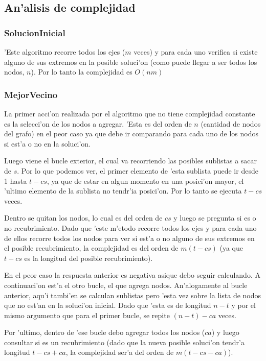 \subsection{An'alisis de complejidad}
\subsubsection{SolucionInicial}
'Este algoritmo recorre todos los ejes ($m$ veces) y para cada uno verifica si existe alguno de sus extremos en la posible soluci'on (como puede llegar a ser todos los nodos, $n$). Por lo tanto la complejidad es $O(nm)$ 

\subsubsection{MejorVecino}
La primer acci'on realizada por el algoritmo que no tiene complejidad constante es la selecci'on de los nodos a agregar. 'Esta es del orden de $n$ (cantidad de nodos del grafo) en el peor caso ya que debe ir comparando para cada uno de los nodos si est'a o no en la soluci'on.

Luego viene el bucle exterior, el cual va recorriendo las posibles sublistas a sacar de $s$. Por lo que podemos ver, el primer elemento de 'esta sublista puede ir desde 1 hasta $t-cs$, ya que de estar en algun momento en una posici'on mayor, el 'ultimo elemento de la sublista no tendr'ia posici'on. Por lo tanto se ejecuta $t-cs$ veces.

Dentro se quitan los nodos, lo cual es del orden de $cs$ y luego se pregunta si es o no recubrimiento. Dado que 'este m'etodo recorre todos los ejes y para cada uno de ellos recorre todos los nodos para ver si est'a o no alguno de sus extremos en el posible recubrimiento, la complejidad es del orden de $m(t-cs)$ (ya que $t-cs$ es la longitud del posible recubrimiento).

En el peor caso la respuesta anterior es negativa asique debo seguir calculando. A continuaci'on est'a el otro bucle, el que agrega nodos. An'alogamente al bucle anterior, aqu'i tambi'en se calculan sublistas pero 'esta vez sobre la lista de nodos que no est'an en la soluci'on inicial. Dado que 'esta es de longitud $n-t$ y por el mismo argumento que para el primer bucle, se repite $(n-t)-ca$ veces.

Por 'ultimo, dentro de 'ese bucle debo agregar todos los nodos ($ca$) y luego consultar si es un recubrimiento (dado que la nueva posible soluci'on tendr'a longitud $t-cs+ca$, la complejidad ser'a del orden de $m(t-cs-ca)$).

